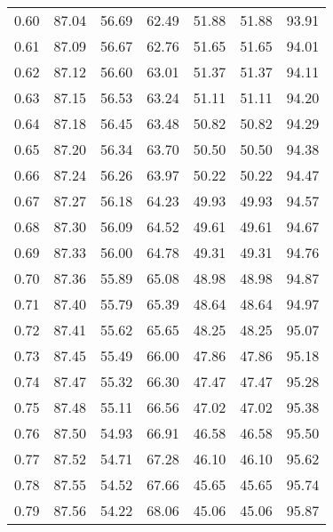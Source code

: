 \begin{tabular}{|c|c|c|c|c|c|c|}
      0.60 &     87.04 &     56.69 &      62.49 &   51.88 &      51.88 &         93.91 \\
      0.61 &     87.09 &     56.67 &      62.76 &   51.65 &      51.65 &         94.01 \\
      0.62 &     87.12 &     56.60 &      63.01 &   51.37 &      51.37 &         94.11 \\
      0.63 &     87.15 &     56.53 &      63.24 &   51.11 &      51.11 &         94.20 \\
      0.64 &     87.18 &     56.45 &      63.48 &   50.82 &      50.82 &         94.29 \\
      0.65 &     87.20 &     56.34 &      63.70 &   50.50 &      50.50 &         94.38 \\
      0.66 &     87.24 &     56.26 &      63.97 &   50.22 &      50.22 &         94.47 \\
      0.67 &     87.27 &     56.18 &      64.23 &   49.93 &      49.93 &         94.57 \\
      0.68 &     87.30 &     56.09 &      64.52 &   49.61 &      49.61 &         94.67 \\
      0.69 &     87.33 &     56.00 &      64.78 &   49.31 &      49.31 &         94.76 \\
      0.70 &     87.36 &     55.89 &      65.08 &   48.98 &      48.98 &         94.87 \\
      0.71 &     87.40 &     55.79 &      65.39 &   48.64 &      48.64 &         94.97 \\
      0.72 &     87.41 &     55.62 &      65.65 &   48.25 &      48.25 &         95.07 \\
      0.73 &     87.45 &     55.49 &      66.00 &   47.86 &      47.86 &         95.18 \\
      0.74 &     87.47 &     55.32 &      66.30 &   47.47 &      47.47 &         95.28 \\
      0.75 &     87.48 &     55.11 &      66.56 &   47.02 &      47.02 &         95.38 \\
      0.76 &     87.50 &     54.93 &      66.91 &   46.58 &      46.58 &         95.50 \\
      0.77 &     87.52 &     54.71 &      67.28 &   46.10 &      46.10 &         95.62 \\
      0.78 &     87.55 &     54.52 &      67.66 &   45.65 &      45.65 &         95.74 \\
      0.79 &     87.56 &     54.22 &      68.06 &   45.06 &      45.06 &         95.87 \\

\end{tabular}
